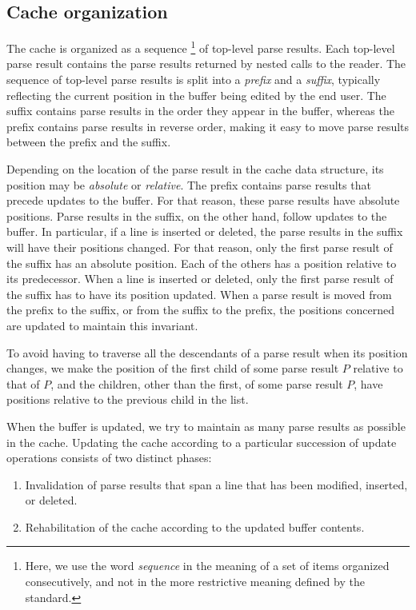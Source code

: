 \subsection{Cache organization}

The cache is organized as a sequence%
\footnote{Here, we use the word \emph{sequence} in the meaning of a
  set of items organized consecutively, and not in the more
  restrictive meaning defined by the \commonlisp{} standard.}  of
top-level parse results.  Each top-level parse result contains the
parse results returned by nested calls to the reader.  The sequence of
top-level parse results is split into a \emph{prefix} and a
\emph{suffix}, typically reflecting the current position in the buffer
being edited by the end user.  The suffix contains parse results in
the order they appear in the buffer, whereas the prefix contains parse
results in reverse order, making it easy to move parse results between
the prefix and the suffix.

Depending on the location of the parse result in the cache data
structure, its position may be \emph{absolute} or \emph{relative}.
The prefix contains parse results that precede updates to the buffer.
For that reason, these parse results have absolute positions.  Parse
results in the suffix, on the other hand, follow updates to the
buffer.  In particular, if a line is inserted or deleted, the parse
results in the suffix will have their positions changed.  For that
reason, only the first parse result of the suffix has an absolute
position.  Each of the others has a position relative to its
predecessor.  When a line is inserted or deleted, only the first parse
result of the suffix has to have its position updated.  When a parse
result is moved from the prefix to the suffix, or from the suffix to
the prefix, the positions concerned are updated to maintain this
invariant.

To avoid having to traverse all the descendants of a parse result when
its position changes, we make the position of the first child of some
parse result $P$ relative to that of $P$, and the children, other than
the first, of some parse result $P$, have positions relative to the
previous child in the list.

When the buffer is updated, we try to maintain as many parse results
as possible in the cache.  Updating the cache according to a
particular succession of update operations consists of two distinct
phases:

\begin{enumerate}
\item Invalidation of parse results that span a line that has been
  modified, inserted, or deleted.
\item Rehabilitation of the cache according to the updated buffer
  contents.
\end{enumerate}

